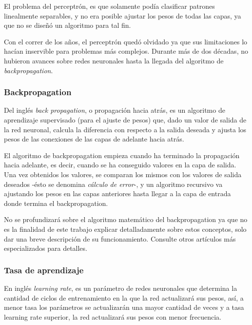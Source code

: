 \documentclass[a4paper,12pt,oneside,spanish]{book}
\begin{document}
El problema del perceptrón, es que solamente podía clasificar patrones linealmente separables, y no era posible ajustar los pesos de todas las capas, ya que no se diseñó un algoritmo para tal fin.\par

Con el correr de los años, el perceptrón quedó olvidado ya que sus limitaciones lo hacían inservible para problemas más complejos. Durante más de dos décadas, no hubieron avances sobre redes neuronales hasta la llegada del algoritmo de \textit{backpropagation}.\par

\subsubsection{Backpropagation}
Del inglés \textit{back propagation}, o propagación hacia atrás, es un algoritmo de aprendizaje supervisado (para el ajuste de pesos) que, dado un valor de salida de la red neuronal, calcula la diferencia con respecto a la salida deseada y ajusta los pesos de las conexiones de las capas de adelante hacia atrás.\par

El algoritmo de backpropagation empieza cuando ha terminado la propagación hacia adelante, es decir, cuando se ha conseguido valores en la capa de salida. Una vez obtenidos los valores, se comparan los mismos con los valores de salida deseados -ésto se denomina \textit{cálculo de error}-, y un algoritmo recursivo va ajustando los pesos en las capas anteriores hasta llegar a la capa de entrada donde termina el backpropagation.\par

No se profundizará sobre el algoritmo matemático del backpropagation ya que no es la finalidad de este trabajo explicar detalladamente sobre estos conceptos, solo dar una breve descripción de su funcionamiento. Consulte otros artículos más especializados para detalles.\par


\subsubsection{Tasa de aprendizaje}
En inglés \textit{learning rate}, es un parámetro de redes neuronales que determina la cantidad de ciclos de entrenamiento en la que la red actualizará sus pesos, así, a menor tasa los parámetros se actualizarán una mayor cantidad de veces y a tasa learning rate superior, la red actualizará sus pesos con menor frecuencia.
\end{document}
